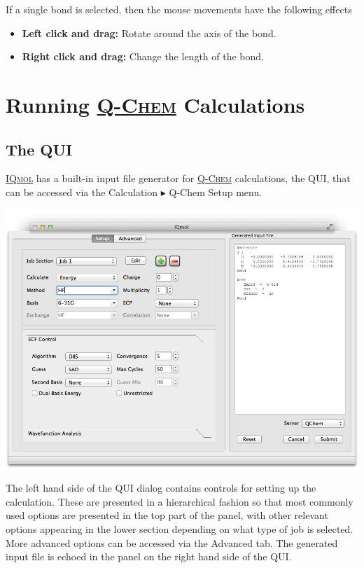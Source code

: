 \documentclass[a4paper,12pt]{article}
\newcommand{\qchem}{\href{http://q-chem.com}{{\scshape Q-Chem}}}
\newcommand{\iqmol}{\href{http://iqmol.org}{{\scshape IQmol}}}
\begin{document}
If a single bond is selected, then the mouse movements have the following effects
\begin{itemize}
\item {\bf Left click and drag:} Rotate around the axis of the bond.
\item {\bf Right click and drag:} Change the length of the bond.
\end{itemize}








\newpage
\section{Running \qchem{} Calculations}

\subsection{The QUI}

\iqmol{} has a built-in input file generator for \qchem{} calculations, the
QUI, that can be accessed via the Calculation $\blacktriangleright$ Q-Chem
Setup menu.  
\begin{center}
\includegraphics[scale=0.4]{figures/QUI.png}
\end{center}
The left hand side of the QUI dialog contains controls for setting up the
calculation.  These are presented in a hierarchical fashion so that most
commonly used options are presented in the top part of the panel, with other
relevant options appearing in the lower section depending on what type of job
is selected.  More advanced options can be accessed via the Advanced tab.  The
generated input file is echoed in the panel on the right hand side of the QUI.\\
\end{document}

